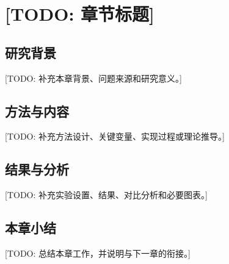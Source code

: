 \chapter{[TODO: 章节标题]}

\section{研究背景}
[TODO: 补充本章背景、问题来源和研究意义。]

\section{方法与内容}
[TODO: 补充方法设计、关键变量、实现过程或理论推导。]

\section{结果与分析}
[TODO: 补充实验设置、结果、对比分析和必要图表。]

\section{本章小结}
[TODO: 总结本章工作，并说明与下一章的衔接。]
